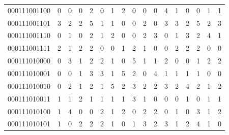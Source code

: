 \documentclass[10pt,a4paper]{article}
\begin{document}
\begin{longtable}{ |c|c|c|c|c|c|c|c|c|c|c|c|c|c|c|c|c| }
    000111001100              & 0                            & 0                                & 0                            & 2                              & 0   & 1   & 2   & 0   & 0   & 0   & 4   & 1   & 0   & 0   & 1   & 1   \\
    000111001101              & 3                            & 2                                & 2                            & 5                              & 1   & 1   & 0   & 0   & 2   & 0   & 3   & 3   & 2   & 5   & 2   & 3   \\
    000111001110              & 0                            & 1                                & 0                            & 2                              & 1   & 2   & 0   & 0   & 2   & 3   & 0   & 1   & 3   & 2   & 4   & 1   \\
    000111001111              & 2                            & 1                                & 2                            & 2                              & 0   & 0   & 1   & 2   & 1   & 0   & 0   & 2   & 2   & 2   & 0   & 0   \\
    000111010000              & 0                            & 3                                & 1                            & 2                              & 2   & 1   & 0   & 5   & 1   & 1   & 2   & 0   & 0   & 1   & 2   & 2   \\
    000111010001              & 0                            & 0                                & 1                            & 3                              & 3   & 1   & 5   & 2   & 0   & 4   & 1   & 1   & 1   & 1   & 0   & 0   \\
    000111010010              & 0                            & 2                                & 1                            & 2                              & 1   & 5   & 2   & 3   & 2   & 2   & 3   & 2   & 4   & 2   & 1   & 2   \\
    000111010011              & 1                            & 1                                & 2                            & 1                              & 1   & 1   & 1   & 3   & 1   & 0   & 0   & 0   & 1   & 0   & 1   & 1   \\
    000111010100              & 1                            & 4                                & 0                            & 0                              & 2   & 1   & 2   & 0   & 2   & 2   & 0   & 1   & 0   & 3   & 1   & 2   \\
    000111010101              & 1                            & 0                                & 2                            & 2                              & 2   & 1   & 0   & 1   & 3   & 2   & 3   & 1   & 2   & 4   & 1   & 0   \\

\end{longtable}
\end{document}
